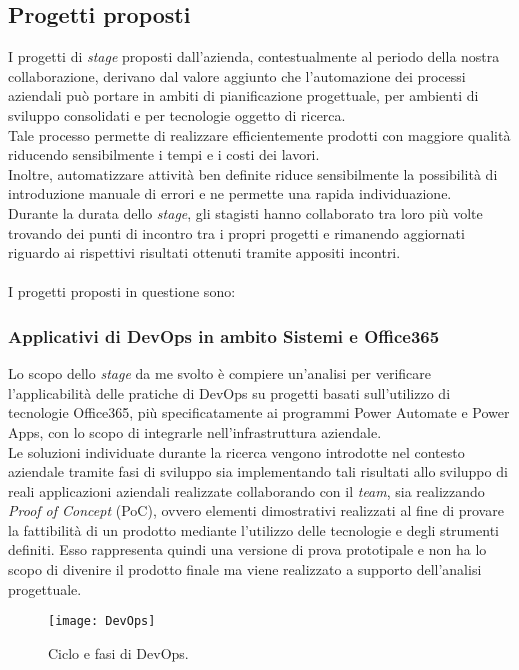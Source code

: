 \subsection{Progetti proposti}
I progetti di \emph{stage} proposti dall'azienda, contestualmente al periodo della nostra collaborazione, derivano dal valore aggiunto che l'automazione dei processi aziendali può portare in ambiti di pianificazione progettuale, per ambienti di sviluppo consolidati e per tecnologie oggetto di ricerca.\\
Tale processo permette di realizzare efficientemente prodotti con maggiore qualità riducendo sensibilmente i tempi e i costi dei lavori.\\
Inoltre, automatizzare attività ben definite riduce sensibilmente la possibilità di introduzione manuale di errori e ne permette una rapida individuazione.\\
Durante la durata dello \emph{stage}, gli stagisti hanno collaborato tra loro più volte trovando dei punti di incontro tra i propri progetti e rimanendo aggiornati riguardo ai rispettivi risultati ottenuti tramite appositi incontri.\\\\
I progetti proposti in questione sono: 

\subsubsection*{Applicativi di DevOps in ambito Sistemi e Office365}
\label{mioStage}
Lo scopo dello \emph{stage} da me svolto è compiere un'analisi per verificare l'applicabilità delle pratiche di \gls{DevOps} su progetti basati sull'utilizzo di tecnologie Office365, più specificatamente ai programmi Power Automate e Power Apps, con lo scopo di integrarle nell'infrastruttura aziendale.\\
Le soluzioni individuate durante la ricerca vengono introdotte nel contesto aziendale tramite fasi di sviluppo sia implementando tali risultati allo sviluppo di reali applicazioni aziendali realizzate collaborando con il \emph{team}, sia realizzando \emph{Proof of Concept} (PoC), ovvero elementi dimostrativi realizzati al fine di provare la fattibilità di un prodotto mediante l'utilizzo delle tecnologie e degli strumenti definiti. Esso rappresenta quindi una versione di prova prototipale e non ha lo scopo di divenire il prodotto finale ma viene realizzato a supporto dell'analisi progettuale.
\begin{figure}[htbp] 
    \centering 
    \texttt{[image: DevOps]}
    \caption{Ciclo e fasi di DevOps.} 
    \label{fig:DevOps}
\end{figure}

